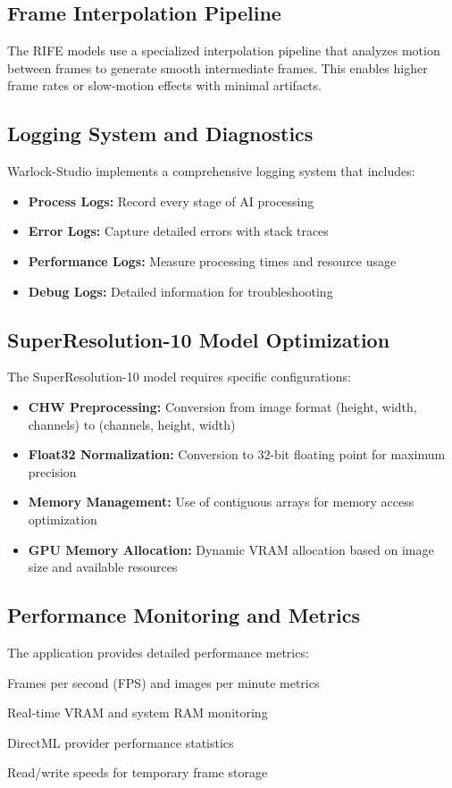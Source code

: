 \documentclass[11pt, a4paper]{article}
\begin{document}
\subsection{Frame Interpolation Pipeline}
The RIFE models use a specialized interpolation pipeline that analyzes motion between frames to generate smooth intermediate frames. This enables higher frame rates or slow-motion effects with minimal artifacts.

\subsection{Logging System and Diagnostics}
Warlock-Studio implements a comprehensive logging system that includes:
\begin{itemize}[leftmargin=*]
    \item \textbf{Process Logs:} Record every stage of AI processing
    \item \textbf{Error Logs:} Capture detailed errors with stack traces
    \item \textbf{Performance Logs:} Measure processing times and resource usage
    \item \textbf{Debug Logs:} Detailed information for troubleshooting
\end{itemize}

\subsection{SuperResolution-10 Model Optimization}
The SuperResolution-10 model requires specific configurations:
\begin{itemize}[leftmargin=*]
    \item \textbf{CHW Preprocessing:} Conversion from image format (height, width, channels) to (channels, height, width)
    \item \textbf{Float32 Normalization:} Conversion to 32-bit floating point for maximum precision
    \item \textbf{Memory Management:} Use of contiguous arrays for memory access optimization
    \item \textbf{GPU Memory Allocation:} Dynamic VRAM allocation based on image size and available resources
\end{itemize}

\subsection{Performance Monitoring and Metrics}
The application provides detailed performance metrics:
\begin{description}[leftmargin=*, style=nextline]
    \item[Processing Speed:] Frames per second (FPS) and images per minute metrics
    \item[Memory Usage:] Real-time VRAM and system RAM monitoring
    \item[GPU Utilization:] DirectML provider performance statistics
    \item[Disk I/O:] Read/write speeds for temporary frame storage
\end{description}
\end{document}
